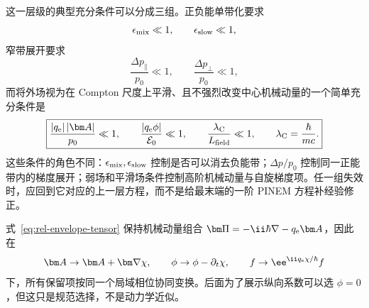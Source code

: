 这一层级的典型充分条件可以分成三组。正负能单带化要求
\begin{equation}
\epsilon_{\rm mix}\ll1,
\qquad
\epsilon_{\rm slow}\ll1,
\end{equation}
窄带展开要求
\begin{equation}
\frac{\Delta p_\parallel}{p_0}\ll1,
\qquad
\frac{\Delta p_\perp}{p_0}\ll1,
\label{eq:narrowband-conditions-vector}
\end{equation}
而将外场视为在 Compton 尺度上平滑、且不强烈改变中心机械动量的一个简单充分条件是
\begin{equation}
\boxed{
\frac{|q_{\rm e}|\,|\bm A|}{p_0}\ll1,
\qquad
\frac{|q_{\rm e}\phi|}{\mathcal E_0}\ll1,
\qquad
\frac{\lambda_{\rm C}}{L_{\rm field}}\ll1,
\qquad
\lambda_{\rm C}=\frac{\hbar}{mc}.}
\label{eq:positive-band-conditions}
\end{equation}
这些条件的角色不同：$\epsilon_{\rm mix},\epsilon_{\rm slow}$ 控制是否可以消去负能带；$\Delta p/p_0$ 控制同一正能带内的梯度展开；弱场和平滑场条件控制高阶机械动量与自旋梯度项。任一组失效时，应回到它对应的上一层方程，而不是给最末端的一阶 PINEM 方程补经验修正。

式~\eqref{eq:rel-envelope-tensor} 保持机械动量组合 $\bm\Pi=-\ii\hbar\nabla-q_{\rm e}\bm A$，因此在
\begin{equation}
\bm A\rightarrow\bm A+\bm\nabla\chi,
\qquad
\phi\rightarrow\phi-\partial_t\chi,
\qquad
f\rightarrow\ee^{\ii q_{\rm e}\chi/\hbar}f
\label{eq:gauge-transform-standard}
\end{equation}
下，所有保留项按同一个局域相位协同变换。后面为了展示纵向系数可以选 $\phi=0$，但这只是规范选择，不是动力学近似。

